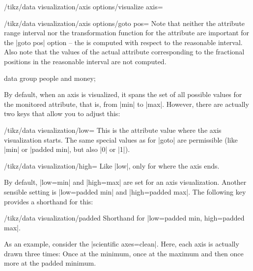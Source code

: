 \begin{key}{/tikz/data visualization/axis options/visualize axis=}
\begin{key}{/tikz/data visualization/axis options/goto pos=}
        Note that neither the attribute range interval nor the transformation
        function for the attribute are important for the |goto pos| option --
        the  is computed with respect to the reasonable
        interval. Also note that the values of the actual attribute
        corresponding to the fractional positions in the reasonable interval
        are not computed.
\begin{codeexample}[
    preamble={\usetikzlibrary{datavisualization}},
    pre={\tikzdatavisualizationset{
  our system/.style={
    new Cartesian axis=x axis,
    new Cartesian axis=left axis,
    new Cartesian axis=right axis,
    x axis={attribute=x},
    left axis={unit vector={(0cm,1pt)}},
    right axis={unit vector={(0cm,1pt)}},
    x axis    ={length=\pgfkeysvalueof{/tikz/data visualization/scientific axes/width}},
    left axis ={length=\pgfkeysvalueof{/tikz/data visualization/scientific axes/height}},
    right axis={length=\pgfkeysvalueof{/tikz/data visualization/scientific axes/height}}
  }
}}]
%
\tikz \datavisualization [
    our system,
    x axis={attribute=time, length=4cm},
    left axis ={attribute=money},
    right axis={attribute=people},
    visualize as line/.list={people 1, people 2, money 1, money 2}]
  data group {people and money};
\end{codeexample}
    \end{key}

    By default, when an axis is visualized, it spans the set of all possible
    values for the monitored attribute, that is, from |min| to |max|. However,
    there are actually two keys that allow you to adjust this:
    \begin{key}{/tikz/data visualization/low=}
        This is the attribute value where the axis visualization starts. The
        same special values as for |goto| are permissible (like |min| or
        |padded min|, but also |0| or |1|).
    \end{key}
    \begin{key}{/tikz/data visualization/high=}
        Like |low|, only for where the axis ends.
    \end{key}

    By default, |low=min| and |high=max| are set for an axis visualization.
    Another sensible setting is |low=padded min| and |high=padded max|. The
    following key provides a shorthand for this:
    \begin{key}{/tikz/data visualization/padded}
        Shorthand for |low=padded min, high=padded max|.
    \end{key}
    As an example, consider the |scientific axes=clean|. Here, each axis is
    actually drawn three times: Once at the minimum, once at the maximum and
    then once more at the padded minimum.



\end{key}
